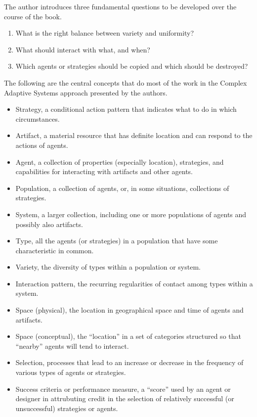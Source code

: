 \documentclass[jou,apacite]{apa6}
\begin{document}
The author introduces three fundamental questions to be developed over the course of the book.
\begin{enumerate}
  \item What is the right balance between variety and uniformity?
  \item What should interact with what, and when?
  \item Which agents or strategies should be copied and which should be destroyed?
\end{enumerate}

The following are the central concepts that do most of the work in the Complex Adaptive Systems approach presented by the authors.
\begin{itemize}
  \item Strategy, a conditional action pattern that indicates what to do in which circumstances.
  \item Artifact, a material resource that has definite location and can respond to the actions of agents.
  \item Agent, a collection of properties (especially location), strategies, and capabilities for interacting with artifacts and other agents.
  \item Population, a collection of agents, or, in some situations, collections of strategies.
  \item System, a larger collection, including one or more populations of agents and possibly also artifacts.
  \item Type, all the agents (or strategies) in a population that have some characteristic in common.
  \item Variety, the diversity of types within a population or system.
  \item Interaction pattern, the recurring regularities of contact among types within a system.
  \item Space (physical), the location in geographical space and time of agents and artifacts.
  \item Space (conceptual), the ``location'' in a set of categories structured so that ``nearby'' agents will tend to interact.
  \item Selection, processes that lead to an increase or decrease in the frequency of various types of agents or strategies.
  \item Success criteria or performance measure, a ``score'' used by an agent or designer in attrubuting credit in the selection of relatively successful (or unsuccessful) strategies or agents.
\end{itemize}
\end{document}
